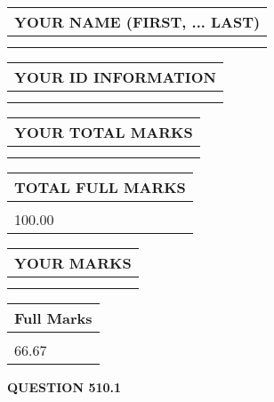 \documentclass{ctexart}
\begin{document}
   
   
   
\newpage 
\setcounter{page}{ 
   510001 } 
   
   
   
   
\noindent\begin{tabular}{|l|}
\hline
YOUR NAME (FIRST, ... LAST)  \\
\hline
 \\ 
 \\ 
\hline
\end{tabular}
\hspace{0.05in} \begin{tabular}{|l|}
\hline
 YOUR   ID   INFORMATION  \\
\hline
 \\ 
 \\ 
\hline
\end{tabular}
   
   
\vspace{0.2in}\noindent\begin{tabular}{|l|}
\hline
YOUR TOTAL MARKS  \\
\hline
 \\ 
 \\ 
\hline
\end{tabular}
\hspace{0.05in} \begin{tabular}{|l|}
\hline
TOTAL FULL MARKS  \\
\hline
 \\ 
100.00 \\
\hline
\end{tabular}
   
   
 \vspace{0.2in}
 
 
 
 
   
   
  
\vspace{0.2in}
  
\noindent\begin{tabular}{|l|}
\hline
 YOUR MARKS  \\
\hline
 \\ 
 \\ 
\hline
\end{tabular}
\hspace{0.05in} \begin{tabular}{|l|}
\hline
 Full Marks  \\
\hline
 \\ 
66.67 \\
\hline
\end{tabular}
{\textbf{\Large{QUESTION
510.1 
}}}
  
\end{document}

